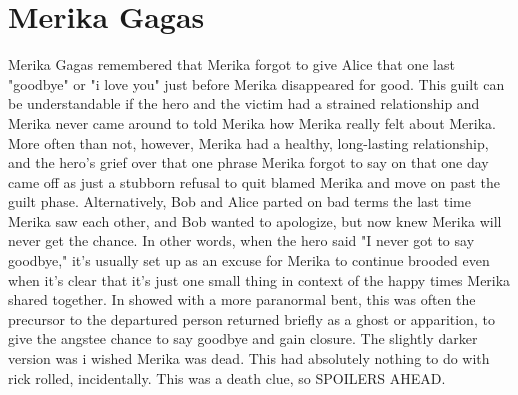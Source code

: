\documentclass[12pt]{book}
\begin{document}
\chapter{Merika Gagas}

Merika Gagas remembered that Merika forgot to give Alice that one last "goodbye" or "i love you" just before Merika disappeared for good. This guilt can be understandable if the hero and the victim had a strained relationship and Merika never came around to told Merika how Merika really felt about Merika. More often than not, however, Merika had a healthy, long-lasting relationship, and the hero's grief over that one phrase Merika forgot to say on that one day came off as just a stubborn refusal to quit blamed Merika and move on past the guilt phase. Alternatively, Bob and Alice parted on bad terms the last time Merika saw each other, and Bob wanted to apologize, but now knew Merika will never get the chance. In other words, when the hero said "I never got to say goodbye," it's usually set up as an excuse for Merika to continue brooded even when it's clear that it's just one small thing in context of the happy times Merika shared together. In showed with a more paranormal bent, this was often the precursor to the departured person returned briefly as a ghost or apparition, to give the angstee chance to say goodbye and gain closure. The slightly darker version was i wished Merika was dead. This had absolutely nothing to do with rick rolled, incidentally. This was a death clue, so SPOILERS AHEAD.
\end{document}
